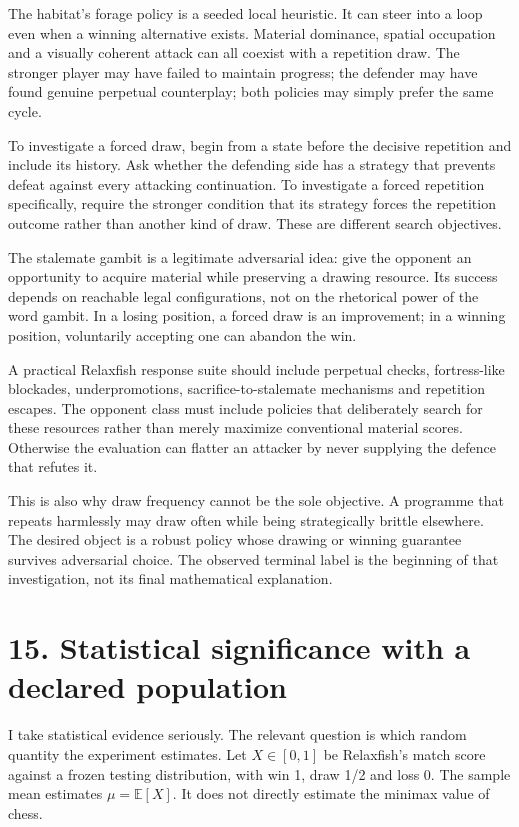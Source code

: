 \documentclass[10pt]{article}
\begin{document}
The habitat's forage policy is a seeded local heuristic. It can steer into a loop even when a winning alternative exists. Material dominance, spatial occupation and a visually coherent attack can all coexist with a repetition draw. The stronger player may have failed to maintain progress; the defender may have found genuine perpetual counterplay; both policies may simply prefer the same cycle.

To investigate a forced draw, begin from a state before the decisive repetition and include its history. Ask whether the defending side has a strategy that prevents defeat against every attacking continuation. To investigate a forced repetition specifically, require the stronger condition that its strategy forces the repetition outcome rather than another kind of draw. These are different search objectives.

The stalemate gambit is a legitimate adversarial idea: give the opponent an opportunity to acquire material while preserving a drawing resource. Its success depends on reachable legal configurations, not on the rhetorical power of the word gambit. In a losing position, a forced draw is an improvement; in a winning position, voluntarily accepting one can abandon the win.

A practical Relaxfish response suite should include perpetual checks, fortress-like blockades, underpromotions, sacrifice-to-stalemate mechanisms and repetition escapes. The opponent class must include policies that deliberately search for these resources rather than merely maximize conventional material scores. Otherwise the evaluation can flatter an attacker by never supplying the defence that refutes it.

This is also why draw frequency cannot be the sole objective. A programme that repeats harmlessly may draw often while being strategically brittle elsewhere. The desired object is a robust policy whose drawing or winning guarantee survives adversarial choice. The observed terminal label is the beginning of that investigation, not its final mathematical explanation.

\clearpage
\section*{15. Statistical significance with a declared population}
I take statistical evidence seriously. The relevant question is which random quantity the experiment estimates. Let $X\in[0,1]$ be Relaxfish's match score against a frozen testing distribution, with win 1, draw 1/2 and loss 0. The sample mean estimates $\mu=\mathbb E[X]$. It does not directly estimate the minimax value of chess.
\end{document}
